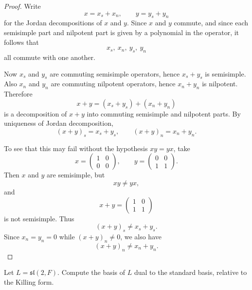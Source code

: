 \begin{proof}
    Write
    \[
        x=x_s+x_n,\qquad y=y_s+y_n
    \]
    for the Jordan decompositions of $x$ and $y$. Since $x$ and $y$ commute, and since each semisimple part and nilpotent part is given by a polynomial in the operator, it follows that
    \[
        x_s,\ x_n,\ y_s,\ y_n
    \]
    all commute with one another.

    Now $x_s$ and $y_s$ are commuting semisimple operators, hence $x_s+y_s$ is semisimple. Also $x_n$ and $y_n$ are commuting nilpotent operators, hence $x_n+y_n$ is nilpotent. Therefore
    \[
        x+y=(x_s+y_s)+(x_n+y_n)
    \]
    is a decomposition of $x+y$ into commuting semisimple and nilpotent parts. By uniqueness of Jordan decomposition,
    \[
        (x+y)_s=x_s+y_s,
        \qquad
        (x+y)_n=x_n+y_n.
    \]

    To see that this may fail without the hypothesis $xy=yx$, take
    \[
        x=
        \begin{pmatrix}
            1 & 0 \\
            0 & 0
        \end{pmatrix},
        \qquad
        y=
        \begin{pmatrix}
            0 & 0 \\
            1 & 1
        \end{pmatrix}.
    \]
    Then $x$ and $y$ are semisimple, but
    \[
        xy\neq yx,
    \]
    and
    \[
        x+y=
        \begin{pmatrix}
            1 & 0 \\
            1 & 1
        \end{pmatrix}
    \]
    is not semisimple. Thus
    \[
        (x+y)_s\neq x_s+y_s.
    \]
    Since $x_n=y_n=0$ while $(x+y)_n\neq 0$, we also have
    \[
        (x+y)_n\neq x_n+y_n.
    \]
\end{proof}

\begin{exercise}
    Let $L=\mathfrak{sl}(2,F)$. Compute the basis of $L$ dual to the standard basis, relative to the Killing form.
\end{exercise}

